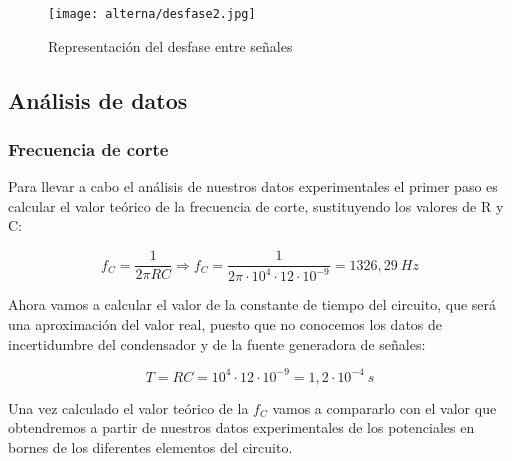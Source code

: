 \documentclass[a4paper,12pt,titlepage]{article}
\begin{document}
\begin{figure}[h]
    \centering
    \texttt{[image: alterna/desfase2.jpg]}
    \caption{Representación del desfase entre señales}
    \label{Desfase}
\end{figure}


\subsection{Análisis de datos}
\subsubsection{Frecuencia de corte}

Para llevar a cabo el análisis de nuestros datos experimentales el primer paso es calcular el valor teórico de la frecuencia de corte, sustituyendo los valores de R y C:

\begin{equation}
    \label{fc}
    f_{C}=\frac{1}{2\pi RC} \Rightarrow f_{C}=\frac{1}{2\pi \cdot 10^4 \cdot 12 \cdot 10^{-9}} = 1326,29\: Hz %
\end{equation}

Ahora vamos a calcular el valor de la constante de tiempo del circuito, que será una aproximación del valor real, puesto que no conocemos los datos de incertidumbre del condensador y de la fuente generadora de señales:

\begin{equation}
    \label{ConstanteT}
    T=RC=10^4 \cdot 12 \cdot 10^{-9}=1,2 \cdot 10^{-4}\: s
\end{equation}

Una vez calculado el valor teórico de la $f_{C}$ vamos a compararlo con el valor que obtendremos a partir de nuestros datos experimentales de los potenciales en bornes de los diferentes elementos del circuito. \newline
\end{document}
